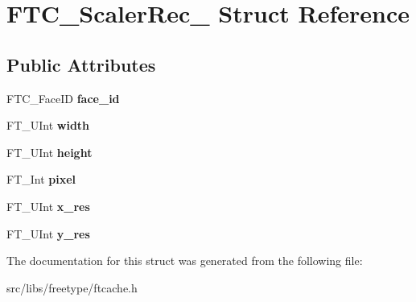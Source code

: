 \hypertarget{struct_f_t_c___scaler_rec__}{
\section{FTC\_\-ScalerRec\_\- Struct Reference}
\label{struct_f_t_c___scaler_rec__}
}
\subsection*{Public Attributes}
\begin{DoxyCompactItemize}
\item 
\hypertarget{struct_f_t_c___scaler_rec___a8e963aa619409e646558fe7aa272e81f}{
FTC\_\-FaceID {\bfseries face\_\-id}}
\label{struct_f_t_c___scaler_rec___a8e963aa619409e646558fe7aa272e81f}

\item 
\hypertarget{struct_f_t_c___scaler_rec___a11e13d907ca4661bf7c1d98fffecf321}{
FT\_\-UInt {\bfseries width}}
\label{struct_f_t_c___scaler_rec___a11e13d907ca4661bf7c1d98fffecf321}

\item 
\hypertarget{struct_f_t_c___scaler_rec___a9b3a9b4d7148bbaa4daaae1e1fbb2dbc}{
FT\_\-UInt {\bfseries height}}
\label{struct_f_t_c___scaler_rec___a9b3a9b4d7148bbaa4daaae1e1fbb2dbc}

\item 
\hypertarget{struct_f_t_c___scaler_rec___ab78868341e2d66f17e6f1d77e9e054d2}{
FT\_\-Int {\bfseries pixel}}
\label{struct_f_t_c___scaler_rec___ab78868341e2d66f17e6f1d77e9e054d2}

\item 
\hypertarget{struct_f_t_c___scaler_rec___a886c7c1230dc5d5e6b3fc32d06274752}{
FT\_\-UInt {\bfseries x\_\-res}}
\label{struct_f_t_c___scaler_rec___a886c7c1230dc5d5e6b3fc32d06274752}

\item 
\hypertarget{struct_f_t_c___scaler_rec___accb53c7a9aeebb41c05f48d14d3dfe71}{
FT\_\-UInt {\bfseries y\_\-res}}
\label{struct_f_t_c___scaler_rec___accb53c7a9aeebb41c05f48d14d3dfe71}

\end{DoxyCompactItemize}


The documentation for this struct was generated from the following file:\begin{DoxyCompactItemize}
\item 
src/libs/freetype/ftcache.h\end{DoxyCompactItemize}
